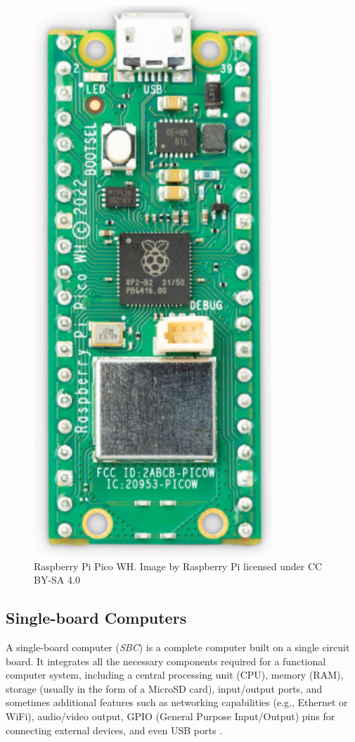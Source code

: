 \begin{figure}[h]
\begin{minipage}[b]{0.45\textwidth}
        \includegraphics[width=.6\textwidth]{Imagenes/Vectorial/piPicoWH.pdf}
        \caption{Raspberry Pi Pico WH. Image by Raspberry Pi licensed under CC BY-SA 4.0}
        \label{fig:piPicoWH}
    \end{minipage}
\end{figure}


%
%
\subsection{Single-board Computers}

A single-board computer (\textit{SBC}) is a complete computer built on a single circuit board. It integrates all 
the necessary components required for a functional computer system, including a central processing unit (CPU), 
memory (RAM), storage (usually in the form of a MicroSD card), input/output ports, and sometimes additional 
features such as networking capabilities (e.g., Ethernet or WiFi), audio/video output, GPIO (General Purpose 
Input/Output) pins for connecting external devices, and even USB ports \cite{microcontroller_vs_sbc}.

